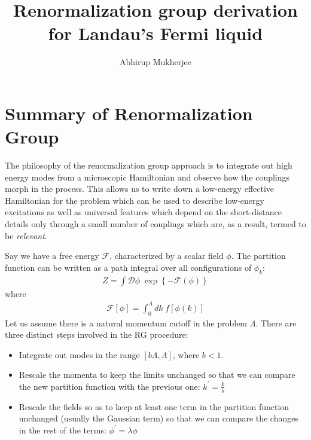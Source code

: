 \documentclass[14pt]{extarticle}
\title{Renormalization group derivation for Landau's Fermi liquid}
\author{Abhirup Mukherjee}
\begin{document}
\maketitle
\tableofcontents
\clearpage
\section{Summary of Renormalization Group}
The philosophy of the renormalization group approach is to integrate out high energy modes from a microscopic Hamiltonian and observe how the couplings morph in the process. This allows us to write down a low-energy effective Hamiltonian for the problem which can be used to describe low-energy excitations as well as universal features which depend on the short-distance details only through a small number of couplings which are, as a result, termed to be \textit{relevant}.

Say we have a free energy \(\mathcal{F}\), characterized by a scalar field \(\phi\). The partition function can be written as a path integral over all configurations of \(\phi_k\):
\begin{equation}\begin{aligned}
\label{oldpart}
Z = \int \mathcal{D}\phi \;\exp\left\{-\mathcal{F}(\phi)\right\}
\end{aligned}\end{equation}
where 
\begin{equation}\begin{aligned}
\mathcal{F}[\phi] = \int_0^\Lambda dk \;f[\phi(k)]
\end{aligned}\end{equation}
Let us assume there is a natural momentum cutoff in the problem \(\Lambda\). There are three distinct steps involved in the RG procedure:
\begin{itemize}
	\item Integrate out modes in the range \(\left[b\Lambda,\Lambda\right]\), where \(b < 1\).
	\item Rescale the momenta to keep the limits unchanged so that we can compare the new partition function with the previous one: \(k^\prime = \frac{k}{b}\)
	\item Rescale the fields so as to keep at least one term in the partition function unchanged (usually the Gaussian term) so that we can compare the changes in the rest of the terms: \(\phi^\prime = \lambda\phi\)
\end{itemize}
\end{document}

